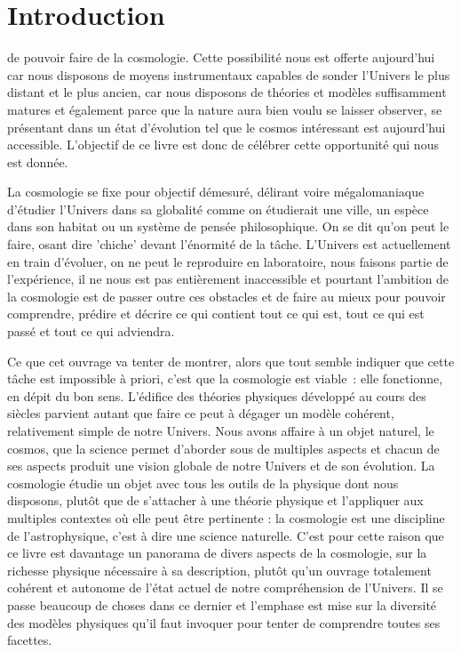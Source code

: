 \chapter*{Introduction}
 de pouvoir faire de la cosmologie. Cette possibilité nous est offerte aujourd'hui car nous disposons de moyens instrumentaux capables de sonder l'Univers le plus distant et le plus ancien, car nous disposons de théories et modèles suffisamment matures et également parce que la nature aura bien voulu se laisser observer, se présentant dans un état d'évolution tel que le cosmos intéressant est aujourd'hui accessible. 
L'objectif de ce livre est donc de célébrer cette opportunité qui nous est donnée.

La cosmologie se fixe pour objectif démesuré, délirant voire mégalomaniaque d'étudier l'Univers dans sa globalité comme on étudierait une ville, un espèce dans son habitat ou un système de pensée philosophique. On se dit qu'on peut le faire, osant dire 'chiche' devant l'énormité de la tâche. L'Univers  est actuellement en train d'évoluer, on ne peut le reproduire en laboratoire, nous faisons partie de l'expérience, il ne nous est pas entièrement inaccessible et pourtant l'ambition de la cosmologie est de passer outre ces obstacles et de faire au mieux pour pouvoir comprendre, prédire et décrire ce qui contient tout ce qui est, tout ce qui est passé et tout ce qui adviendra.

Ce que cet ouvrage va tenter de montrer, alors que tout semble indiquer que cette tâche est impossible à priori, c'est que la cosmologie est viable~: elle fonctionne, en dépit du bon sens. L'édifice des théories physiques développé au cours des siècles parvient autant que faire ce peut à dégager un modèle cohérent, relativement simple de notre Univers. Nous avons affaire à un objet naturel, le cosmos, que la science permet d'aborder sous de multiples aspects et chacun de ses aspects produit une vision globale de notre Univers et de son évolution. La cosmologie étudie un objet avec tous les outils de la physique dont nous disposons, plutôt que de s'attacher à une théorie physique et l'appliquer aux multiples contextes où elle peut être pertinente : la cosmologie est une discipline de l'astrophysique, c'est à dire une science naturelle. C'est pour cette raison que ce livre est davantage un panorama de divers aspects de la cosmologie, sur la richesse physique nécessaire à sa description, plutôt qu'un ouvrage totalement cohérent et autonome de l'état actuel de notre compréhension de l'Univers. Il se passe beaucoup de choses dans ce dernier et l'emphase est mise sur la diversité des modèles physiques qu'il faut invoquer pour tenter de comprendre toutes ses facettes.


